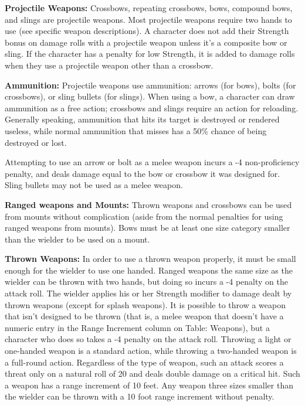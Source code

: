 \textbf{Projectile Weapons:} Crossbows, repeating crossbows, bows, compound bows, and slings are projectile weapons. Most projectile weapons require two hands to use (see specific weapon descriptions). A character does not add their Strength bonus on damage rolls with a projectile weapon unless it's a composite bow or sling. If the character has a penalty for low Strength, it is added to damage rolls when they use a projectile weapon other than a crossbow.

\textbf{Ammunition:} Projectile weapons use ammunition: arrows (for bows), bolts (for crossbows), or sling bullets (for slings). When using a bow, a character can draw ammunition as a free action; crossbows and slings require an action for reloading. Generally speaking, ammunition that hits its target is destroyed or rendered useless, while normal ammunition that misses has a 50\% chance of being destroyed or lost. 

Attempting to use an arrow or bolt as a melee weapon incurs a -4 non-proficiency penalty, and deals damage equal to the bow or crossbow it was designed for. Sling bullets may not be used as a melee weapon.

\textbf{Ranged weapons and Mounts:} Thrown weapons and crossbows can be used from mounts without complication (aside from the normal penalties for using ranged weapons from mounts). Bows must be at least one size category smaller than the wielder to be used on a mount.

\textbf{Thrown Weapons:} In order to use a thrown weapon properly, it must be small enough for the wielder to use one handed. Ranged weapons the same size as the wielder can be thrown with two hands, but doing so incurs a -4 penalty on the attack roll. The wielder applies his or her Strength modifier to damage dealt by thrown weapons (except for splash weapons). It is possible to throw a weapon that isn't designed to be thrown (that is, a melee weapon that doesn't have a numeric entry in the Range Increment column on Table: Weapons), but a character who does so takes a -4 penalty on the attack roll. Throwing a light or one-handed weapon is a standard action, while throwing a two-handed weapon is a full-round action. Regardless of the type of weapon, such an attack scores a threat only on a natural roll of 20 and deals double damage on a critical hit. Such a weapon has a range increment of 10 feet. Any weapon three sizes smaller than the wielder can be thrown with a 10 foot range increment without penalty. 

